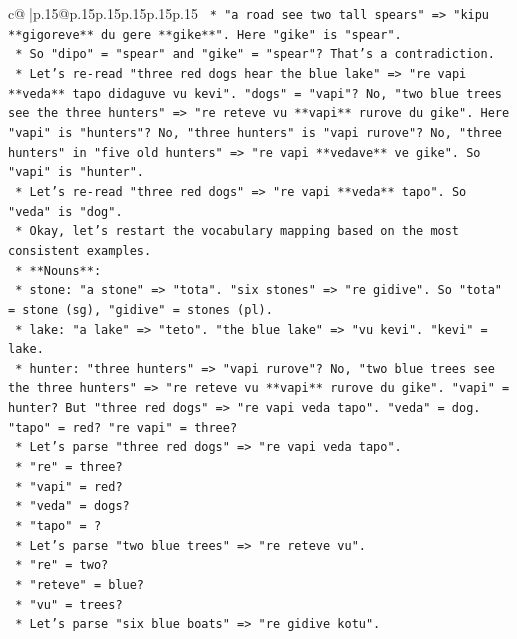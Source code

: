 \documentclass{article}
\begin{document}
{\begin{supertabular}{c@{$\;$}|p{.15\linewidth}@{}p{.15\linewidth}p{.15\linewidth}p{.15\linewidth}p{.15\linewidth}p{.15\linewidth}}
{{{\texttt{        *   "a road see two tall spears" => "kipu **gigoreve** du gere **gike**". Here "gike" is "spear".} \\
\texttt{        *   So "dipo" = "spear" and "gike" = "spear"? That's a contradiction.} \\
\texttt{        *   Let's re{-}read "three red dogs hear the blue lake" => "re vapi **veda** tapo didaguve vu kevi". "dogs" = "vapi"? No, "two blue trees see the three hunters" => "re reteve vu **vapi** rurove du gike". Here "vapi" is "hunters"? No, "three hunters" is "vapi rurove"? No, "three hunters" in "five old hunters" => "re vapi **vedave** ve gike". So "vapi" is "hunter".} \\
\texttt{        *   Let's re{-}read "three red dogs" => "re vapi **veda** tapo". So "veda" is "dog".} \\
\texttt{        *   Okay, let's restart the vocabulary mapping based on the most consistent examples.} \\
\texttt{        *   **Nouns**:} \\
\texttt{            *   stone: "a stone" => "tota". "six stones" => "re gidive". So "tota" = stone (sg), "gidive" = stones (pl).} \\
\texttt{            *   lake: "a lake" => "teto". "the blue lake" => "vu kevi". "kevi" = lake.} \\
\texttt{            *   hunter: "three hunters" => "vapi rurove"? No, "two blue trees see the three hunters" => "re reteve vu **vapi** rurove du gike". "vapi" = hunter? But "three red dogs" => "re vapi veda tapo". "veda" = dog. "tapo" = red? "re vapi" = three?} \\
\texttt{            *   Let's parse "three red dogs" => "re vapi veda tapo".} \\
\texttt{                *   "re" = three?} \\
\texttt{                *   "vapi" = red?} \\
\texttt{                *   "veda" = dogs?} \\
\texttt{                *   "tapo" = ?} \\
\texttt{            *   Let's parse "two blue trees" => "re reteve vu".} \\
\texttt{                *   "re" = two?} \\
\texttt{                *   "reteve" = blue?} \\
\texttt{                *   "vu" = trees?} \\
\texttt{            *   Let's parse "six blue boats" => "re gidive kotu".} \\
}}}
\end{supertabular}}
\end{document}
